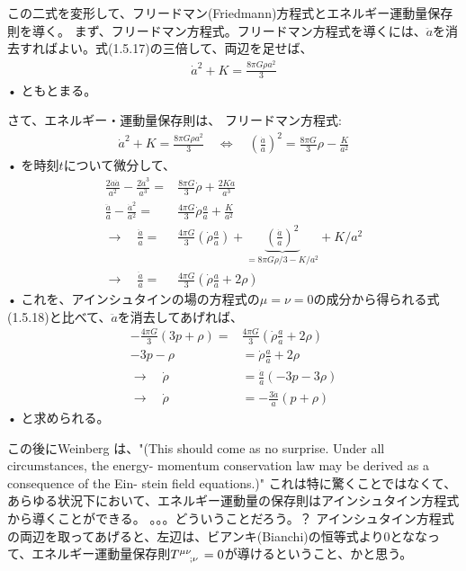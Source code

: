 \documentclass[11pt,a4paper,dvipdfmx]{jsarticle}
\theoremstyle{plain}
\theoremstyle{break}
\begin{document}
この二式を変形して、フリードマン(Friedmann)方程式とエネルギー運動量保存則を導く。
まず、フリードマン方程式。フリードマン方程式を導くには、$\ddot{a}$を消去すればよい。式(1.5.17)の三倍して、両辺を足せば、
\begin{align}
  \dot{a}^{2}+K=\frac{8 \pi G \rho a^{2}}{3} \label{eq:1.5.19-friedmann}
\end{align}•%
ともとまる。

さて、エネルギー・運動量保存則は、
フリードマン方程式:
\begin{align}
  \dot{a}^{2}+K=\frac{8 \pi G \rho a^{2}}{3}  \quad \Leftrightarrow \quad \left(\frac{\dot{a}}{a} \right)^2 = \frac{8\pi G}{3} \rho - \frac{K}{a^2}
\end{align}•%
を時刻$t$について微分して、
\begin{align}
\frac{2 \dot{a} \ddot{a}}{a^2} - \frac{2 \dot{a}^3 }{a^3 } =&\frac{8 \pi G}{3} \dot{\rho} + \frac{2K \dot{a}}{a^3} \\
\frac{\ddot{a}}{a} - \frac{\dot{a}^2}{a^2} =& \frac{4  \pi G}{3} \dot{\rho} \frac{a}{\dot{a}} + \frac{K}{a^2}\\
\rightarrow \quad \frac{\ddot{a}}{a} =& \frac{4 \pi G}{3}(\dot{\rho} \frac{a}{\dot{a}}) + \underbrace{(\frac{\dot{a}}{a})^2}_{=
8\pi G \rho /3 - {K}/{a^2} } +{K}/{a^2}  \\
\rightarrow \quad \frac{\ddot{a}}{a} =& \frac{4 \pi G}{3} ( \dot{\rho} \frac{a}{\dot{a}} + 2 \rho)
\end{align}•%
これを、アインシュタインの場の方程式の$\mu = \nu = 0$の成分から得られる式(1.5.18)と比べて、$\ddot{a}$を消去してあげれば、
\begin{align}
 - \frac{4 \pi G}{3}  ( 3 p + \rho)  = & \frac{4 \pi G}{3} ( \dot{\rho} \frac{a}{\dot{a}} + 2 \rho) \\
 -3p - \rho &= \dot{\rho} \frac{a}{\dot{a}} + 2\rho \\
 \rightarrow \quad \dot{\rho} &= \frac{\dot{a}}{a}(-3p -3\rho) \\
 \rightarrow \quad \dot{\rho} &= -\frac{3\dot{a}}{a}(p + \rho)
\end{align}•%
と求められる。

この後にWeinberg は、"(This should come as no surprise. Under all circumstances, the energy- momentum conservation law may be derived as a consequence of the Ein- stein field equations.)"
これは特に驚くことではなくて、あらゆる状況下において、エネルギー運動量の保存則はアインシュタイン方程式から導くことができる。
。。。どういうことだろう。？
アインシュタイン方程式の両辺を取ってあげると、左辺は、ビアンキ(Bianchi)の恒等式より0とななって、エネルギー運動量保存則$\tensor{T}{^{\mu \nu}_{;\nu}} =0$が導けるということ、かと思う。
\end{document}
